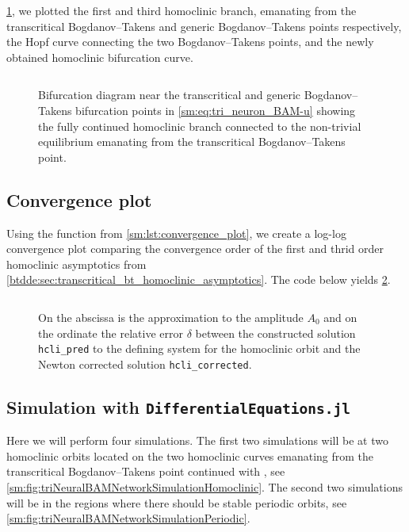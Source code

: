 \cref{sm:fig:triNeuronBAMNeuralNetworkModelConnectionHomoclinicParameters}, we plotted the first and third homoclinic branch, emanating from the
transcritical Bogdanov--Takens and generic Bogdanov--Takens points
respectively, the Hopf curve connecting the two Bogdanov--Takens points, and
the newly obtained homoclinic bifurcation curve.
\inputminted[firstline=501, lastline=529]{MATLAB}{\pathToDDEBifToolDemos/BAM_neural_network_model/BAMnn.m}
\begin{figure}[ht]
    \centering
    \caption{
    Bifurcation diagram near the transcritical and generic Bogdanov--Takens
    bifurcation points in \cref{sm:eq:tri_neuron_BAM-u} showing the fully continued
    homoclinic branch connected to the non-trivial equilibrium emanating from the
    transcritical Bogdanov--Takens point.}
    \label{sm:fig:triNeuronBAMNeuralNetworkModelConnectionHomoclinicParameters}
\end{figure}


\subsection{Convergence plot}
\label{sm:sec:tri_neuron_BAM:convergence_plot}
Using the function from \cref{sm:lst:convergence_plot}, we create a log-log
convergence plot comparing the convergence order of the first and thrid order
homoclinic asymptotics from \cref{btdde:sec:transcritical_bt_homoclinic_asymptotics}.
The code below yields \cref{sm:fig:triNeuralBAMNetworkModelConvergencePlot}.
\inputminted[firstline=531, lastline=542]{MATLAB}{\pathToDDEBifToolDemos/BAM_neural_network_model/BAMnn.m}
\begin{figure}[ht]
    \centering
     \caption{On the abscissa is the approximation to the amplitude $A_0$ and on
        the ordinate the relative error $\delta$ between the constructed solution
        \texttt{hcli_pred} to the defining system for the homoclinic orbit
        and the Newton corrected solution \texttt{hcli_corrected}.}
    \label{sm:fig:triNeuralBAMNetworkModelConvergencePlot}
\end{figure}

\subsection{Simulation with {\tt DifferentialEquations.jl}}
\label{sm:sec:triNeuralBAMNetworkModelSimulation}
Here we will perform four simulations. The first two simulations will be at two
homoclinic orbits located on the two homoclinic curves emanating from the
transcritical Bogdanov--Takens point continued with \DDEBIFTOOL, see
\cref{sm:fig:triNeuralBAMNetworkSimulationHomoclinic}. The second two simulations will be in
the regions where there should be stable periodic orbits, see
\cref{sm:fig:triNeuralBAMNetworkSimulationPeriodic}.

